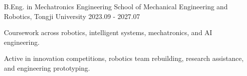 
\begin{cventries}

  \cventry
    {B.Eng. in Mechatronics Engineering}
    {School of Mechanical Engineering and Robotics, Tongji University}
    {}
    {2023.09 - 2027.07}
    {
      \begin{cvitems}
        \item {Coursework across robotics, intelligent systems, mechatronics, and AI engineering.}
        \item {Active in innovation competitions, robotics team rebuilding, research assistance, and engineering prototyping.}
      \end{cvitems}
    }

\end{cventries}

